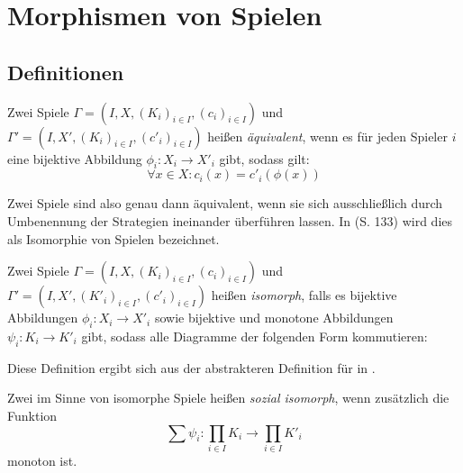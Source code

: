 \section[Morphismen]{Morphismen von Spielen}\label{sec:Morphismen}

\subsection{Definitionen}

\begin{defn}
	Zwei Spiele $\Gamma = (I, X, (K_i)_{i\in I}, (c_i)_{i\in I})$ und $\Gamma' = (I, X', (K_i)_{i\in I}, (c'_i)_{i\in I})$ heißen \emph{äquivalent}, wenn es für jeden Spieler $i$ eine bijektive Abbildung $\phi_i: X_i \to X'_i$ gibt, sodass gilt:
		\[\forall x \in X: c_i(x) = c'_i(\phi(x)) \]
\end{defn}

\begin{bem}
	Zwei Spiele sind also genau dann äquivalent, wenn sie sich ausschließlich durch Umbenennung der Strategien ineinander überführen lassen. In \cite{MonShap} (S. 133) wird dies als Isomorphie von Spielen bezeichnet.
\end{bem}

\begin{defn}\label{def:SpielIsomLap}
	Zwei Spiele $\Gamma = (I, X, (K_i)_{i\in I}, (c_i)_{i\in I})$ und $\Gamma' = (I, X', (K'_i)_{i\in I}, (c'_i)_{i\in I})$ heißen \emph{isomorph}, falls es bijektive Abbildungen $\phi_i: X_i \to X'_i$ sowie bijektive und monotone Abbildungen $\psi_i: K_i \to K'_i$ gibt, sodass alle Diagramme der folgenden Form kommutieren:
	
	\begin{center}
	\end{center}
\end{defn}

\begin{bem}
	Diese Definition ergibt sich aus der abstrakteren Definition für  in \cite{LapGameCat}.
\end{bem}

\begin{defn}
	Zwei im Sinne von  isomorphe Spiele heißen \emph{sozial isomorph}, wenn zusätzlich die Funktion
		\[\sum \psi_i: \prod_{i \in I}K_i \to \prod_{i \in I} K'_i \]
	monoton ist. 
\end{defn}

